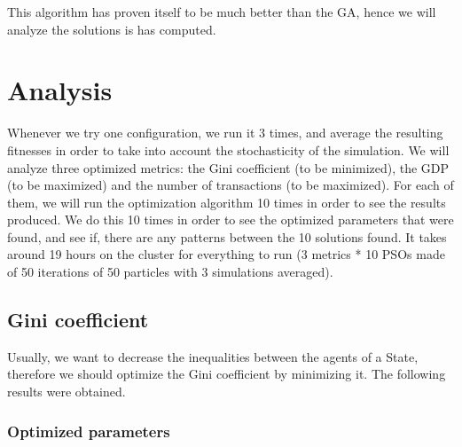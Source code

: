     This algorithm has proven itself to be much better than the GA, hence we will analyze the solutions is has computed. 

\section{Analysis}
    Whenever we try one configuration, we run it 3 times, and average the resulting fitnesses in order to take into account the stochasticity of the simulation. We will analyze three optimized metrics: the Gini coefficient (to be minimized), the GDP (to be maximized) and the number of transactions (to be maximized). For each of them, we will run the optimization algorithm 10 times in order to see the results produced. We do this 10 times in order to see the optimized parameters that were found, and see if, there are any patterns between the 10 solutions found. It takes around 19 hours on the cluster for everything to run (3 metrics * 10 PSOs made of 50 iterations of 50 particles with 3 simulations averaged).

    \subsection{Gini coefficient}

        Usually, we want to decrease the inequalities between the agents of a State, therefore we should optimize the Gini coefficient by minimizing it. The following results were obtained.
    
        \subsubsection{Optimized parameters}

